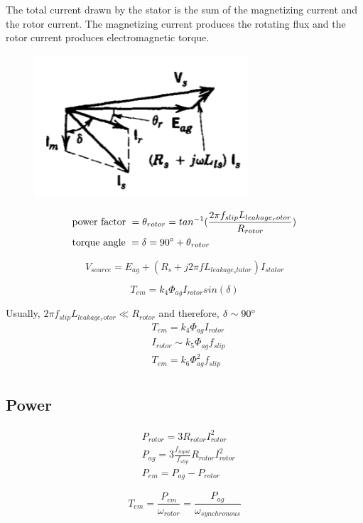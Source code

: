 \documentclass{article}
\begin{document}
        The total current drawn by the stator is the sum of the magnetizing current and the rotor current.
        The magnetizing current produces the rotating flux and the rotor current produces electromagnetic torque.

        \begin{figure}[H]
                \centering
                \includegraphics[width=8cm]{figures/rotor_stator_phasor.png}
        \end{figure}

        \begin{align*}        
            &\text{power factor } = \theta_{rotor} = tan^{-1}(\frac{2\pi f_{slip} L_{leakage_rotor}}{R_{rotor}})\\
            &\text{torque angle } = \delta = 90\degree + \theta_{rotor}
        \end{align*}

        \begin{equation*}
            V_{source} = E_{ag} + (R_{s} + j2\pi f L_{leakage_stator}) I_{stator}
        \end{equation*}

        \begin{equation*}
            T_{em} = k_{4}\Phi_{ag}I_{rotor}sin(\delta)
        \end{equation*}

        Usually, $2\pi f_{slip}L_{leakage_rotor} \ll R_{rotor}$ and therefore, $\delta \sim 90\degree $
        \begin{align*}
            &T_{em} = k_{4}\Phi_{ag}I_{rotor}\\
            &I_{rotor} \sim k_{5}\Phi_{ag} f_{slip}\\
            &T_{em} = k_{6} \Phi^{2}_{ag} f_{slip}\\
        \end{align*}

    \subsection*{Power}
        \begin{align*}
            &P_{rotor} = 3 R_{rotor} I_{rotor}^{2}\\
            &P_{ag} = 3 \frac{f_{input}}{f_{slip}} R_{rotor} I_{rotor}^{2}\\
            &P_{em} = P_{ag} - P_{rotor} 
        \end{align*}

        \begin{equation*}
            T_{em} = \frac{P_{em}}{\omega_{rotor}} = \frac{P_{ag}}{\omega_{synchronous}}
        \end{equation*}


   



    





    

    
\end{document}
